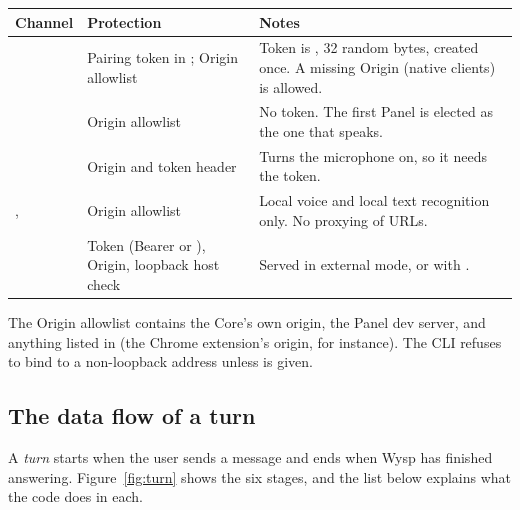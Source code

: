 \begin{xltabular}{\textwidth}{@{}L{3.2cm}L{3.9cm}Y@{}}
\toprule
\textbf{Channel} & \textbf{Protection} & \textbf{Notes} \\
\midrule
{} & Pairing token in ; Origin allowlist & Token is , 32 random bytes, created once. A missing Origin (native clients) is allowed. \\
 & Origin allowlist & No token. The first Panel is elected as the one that speaks. \\
 & Origin and token header  & Turns the microphone on, so it needs the token. \\
,  & Origin allowlist & Local voice and local text recognition only. No proxying of URLs. \\
 & Token (Bearer or ), Origin, loopback host check & Served in external mode, or with . \\
\bottomrule
\end{xltabular}

The Origin allowlist contains the Core's own origin, the Panel dev server, and anything listed in  (the Chrome extension's origin, for instance). The CLI refuses to bind to a non-loopback address unless  is given.

\subsection{The data flow of a turn}\label{sec:turn}

A \emph{turn} starts when the user sends a message and ends when Wysp has finished answering. Figure~\ref{fig:turn} shows the six stages, and the list below explains what the code does in each.

